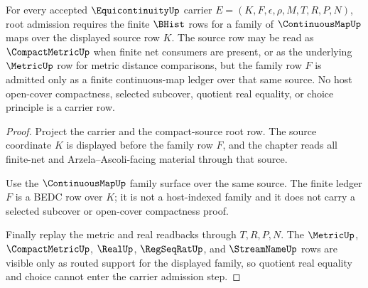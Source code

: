 \begin{theorem}
\label{thm:equicontinuity-root-obligation-carrier}
For every accepted $\EquicontinuityUp$ carrier
$E=(K,F,\epsilon,\rho,M,T,R,P,N)$, root admission requires the finite
$\BHist$ rows for a family of $\ContinuousMapUp$ maps over the displayed
source row $K$. The source row may be read as $\CompactMetricUp$ when finite
net consumers are present, or as the underlying $\MetricUp$ row for metric
distance comparisons, but the family row $F$ is admitted only as a finite
continuous-map ledger over that same source. No host open-cover compactness,
selected subcover, quotient real equality, or choice principle is a carrier
row.
\end{theorem}
\begin{proof}
Project the carrier and the compact-source root row. The source coordinate
$K$ is displayed before the family row $F$, and the chapter reads all
finite-net and Arzela--Ascoli-facing material through that source.

Use the $\ContinuousMapUp$ family surface over the same source. The finite
ledger $F$ is a BEDC row over $K$; it is not a host-indexed family and it does
not carry a selected subcover or open-cover compactness proof.

Finally replay the metric and real readbacks through $T,R,P,N$. The
$\MetricUp$, $\CompactMetricUp$, $\RealUp$, $\RegSeqRatUp$, and
$\StreamNameUp$ rows are visible only as routed support for the displayed
family, so quotient real equality and choice cannot enter the carrier
admission step.
\end{proof}

